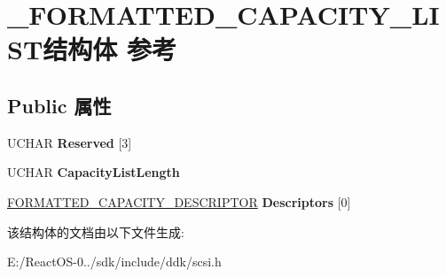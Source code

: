 \hypertarget{struct___f_o_r_m_a_t_t_e_d___c_a_p_a_c_i_t_y___l_i_s_t}{}\section{\+\_\+\+F\+O\+R\+M\+A\+T\+T\+E\+D\+\_\+\+C\+A\+P\+A\+C\+I\+T\+Y\+\_\+\+L\+I\+S\+T结构体 参考}
\label{struct___f_o_r_m_a_t_t_e_d___c_a_p_a_c_i_t_y___l_i_s_t}
\subsection*{Public 属性}
\begin{DoxyCompactItemize}
\item 
\mbox{\label{struct___f_o_r_m_a_t_t_e_d___c_a_p_a_c_i_t_y___l_i_s_t_a696322d2ba4c10ffa1163f0d23bf7263}} 
U\+C\+H\+AR {\bfseries Reserved} \mbox{[}3\mbox{]}
\item 
\mbox{\label{struct___f_o_r_m_a_t_t_e_d___c_a_p_a_c_i_t_y___l_i_s_t_af7a460e0a9e333db6a1da1ed35ebf262}} 
U\+C\+H\+AR {\bfseries Capacity\+List\+Length}
\item 
\mbox{\label{struct___f_o_r_m_a_t_t_e_d___c_a_p_a_c_i_t_y___l_i_s_t_a30ff5c46cfd07c041c203a87e94f8366}} 
\hyperlink{struct___f_o_r_m_a_t_t_e_d___c_a_p_a_c_i_t_y___d_e_s_c_r_i_p_t_o_r}{F\+O\+R\+M\+A\+T\+T\+E\+D\+\_\+\+C\+A\+P\+A\+C\+I\+T\+Y\+\_\+\+D\+E\+S\+C\+R\+I\+P\+T\+OR} {\bfseries Descriptors} \mbox{[}0\mbox{]}
\end{DoxyCompactItemize}


该结构体的文档由以下文件生成\+:\begin{DoxyCompactItemize}
\item 
E\+:/\+React\+O\+S-\/0../sdk/include/ddk/scsi.\+h\end{DoxyCompactItemize}
